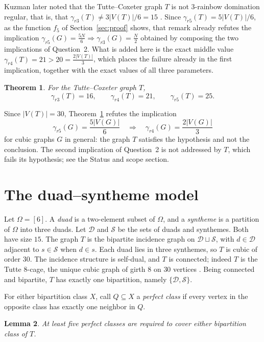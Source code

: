 \documentclass[11pt]{amsart}
\newtheorem{theorem}{Theorem}
\newtheorem{lemma}[theorem]{Lemma}
\begin{document}
Kuzman later noted that the Tutte--Coxeter graph $T$ is not
$3$-rainbow domination regular, that is, that
$\gamma_{r3}(T)\neq 3|V(T)|/6=15$ \cite[Question~(Q6),
p.~37]{Kuzman2025}. Since $\gamma_{r5}(T)=5|V(T)|/6$, as the function
$f_5$ of Section~\ref{sec:proof} shows, that remark already refutes the
implication $\gamma_{r5}(G)=\frac{5N}{6}\Rightarrow
\gamma_{r3}(G)=\frac{N}{2}$ obtained by composing the two implications
of Question~2. What is added here is the exact middle value
$\gamma_{r4}(T)=21>20=\frac{2|V(T)|}{3}$, which places the failure
already in the first implication, together with the exact values of all
three parameters.

\begin{theorem}\label{thm:main}
For the Tutte--Coxeter graph $T$,
\[
  \gamma_{r3}(T)=16,\qquad
  \gamma_{r4}(T)=21,\qquad
  \gamma_{r5}(T)=25.
\]
\end{theorem}

Since $|V(T)|=30$, Theorem~\ref{thm:main} refutes the implication
\[
  \gamma_{r5}(G)=\frac{5|V(G)|}{6}
  \quad\Longrightarrow\quad
  \gamma_{r4}(G)=\frac{2|V(G)|}{3}
\]
for cubic graphs $G$ in general: the graph $T$ satisfies the hypothesis
and not the conclusion. The second implication of Question~2 is not
addressed by $T$, which fails its hypothesis; see the Status and scope
section.

\section{The duad--syntheme model}\label{sec:model}

Let $\Omega=[6]$. A \emph{duad} is a two-element subset of $\Omega$,
and a \emph{syntheme} is a partition of $\Omega$ into three duads. Let
$\mathcal D$ and $\mathcal S$ be the sets of duads and synthemes. Both
have size $15$. The graph $T$ is the bipartite incidence graph on
$\mathcal D\sqcup\mathcal S$, with $d\in\mathcal D$ adjacent to
$s\in\mathcal S$ when $d\in s$. Each duad lies in three synthemes, so
$T$ is cubic of order $30$. The incidence structure is self-dual, and
$T$ is connected; indeed $T$ is the Tutte $8$-cage, the unique cubic
graph of girth $8$ on $30$ vertices \cite{Coxeter1950}. Being connected
and bipartite, $T$ has exactly one bipartition, namely
$\{\mathcal D,\mathcal S\}$.

For either bipartition class $X$, call $Q\subseteq X$ a
\emph{perfect class} if every vertex in the opposite class has exactly
one neighbor in $Q$.

\begin{lemma}\label{lem:cover}
At least five perfect classes are required to cover either bipartition
class of $T$.
\end{lemma}
\end{document}
